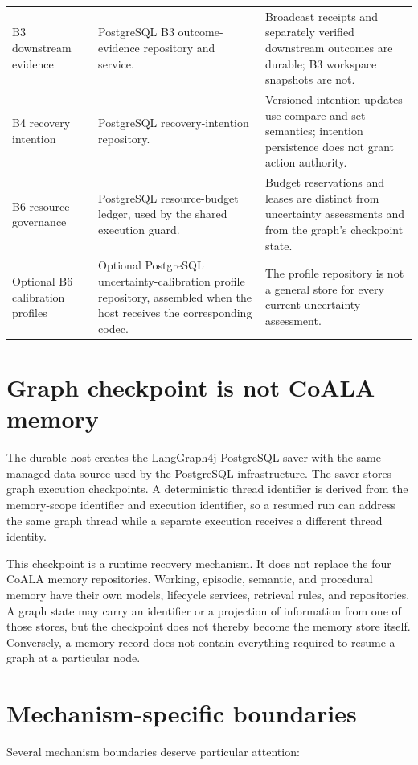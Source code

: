 \begin{longtable}{P{0.19\textwidth} P{0.39\textwidth} P{0.32\textwidth}}
B3 downstream evidence & PostgreSQL B3 outcome-evidence repository and service. & Broadcast receipts and separately verified downstream outcomes are durable; B3 workspace snapshots are not. \\
B4 recovery intention & PostgreSQL recovery-intention repository. & Versioned intention updates use compare-and-set semantics; intention persistence does not grant action authority. \\
B6 resource governance & PostgreSQL resource-budget ledger, used by the shared execution guard. & Budget reservations and leases are distinct from uncertainty assessments and from the graph's checkpoint state. \\
Optional B6 calibration profiles & Optional PostgreSQL uncertainty-calibration profile repository, assembled when the host receives the corresponding codec. & The profile repository is not a general store for every current uncertainty assessment. \\
\bottomrule
\end{longtable}

\section{Graph checkpoint is not CoALA memory}

The durable host creates the LangGraph4j PostgreSQL saver with the same managed data source used by the PostgreSQL infrastructure. The saver stores graph execution checkpoints. A deterministic thread identifier is derived from the memory-scope identifier and execution identifier, so a resumed run can address the same graph thread while a separate execution receives a different thread identity.

This checkpoint is a runtime recovery mechanism. It does not replace the four CoALA memory repositories. Working, episodic, semantic, and procedural memory have their own models, lifecycle services, retrieval rules, and repositories. A graph state may carry an identifier or a projection of information from one of those stores, but the checkpoint does not thereby become the memory store itself. Conversely, a memory record does not contain everything required to resume a graph at a particular node.

\section{Mechanism-specific boundaries}

Several mechanism boundaries deserve particular attention:

